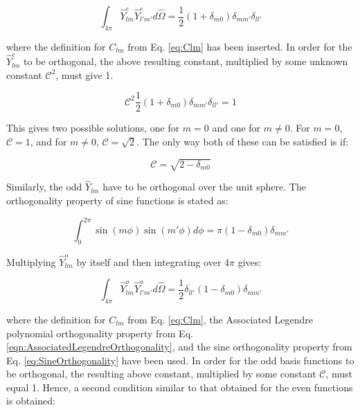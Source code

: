 \documentclass[10pt]{article}
\newcommand{\hO}{\hat{\Omega}}
\begin{document}
\begin{flushleft}
\begin{tcolorbox}[breakable]
\begin{equation}
\label{eq:EvenRequriedOrthogonality2}
\int_{4\pi}^{}\hat{Y}_{lm}^e\hat{Y}_{l'm'}^ed\hO  =\frac{1}{2}(1+\delta_{m0})\delta_{mm'}\delta_{ll'}
\end{equation}

where the definition for \(C_{lm}\) from Eq. \eqref{eq:Clm} has been inserted. In order for the \(\hat{Y}_{lm}^e\) to be orthogonal, the above resulting constant, multiplied by some unknown constant \(\mathscr{C}^2\), must give 1. 

\begin{equation}
\mathscr{C}^2\frac{1}{2}(1+\delta_{m0})\delta_{mm'}\delta_{ll'}=1
\end{equation}

This gives two possible solutions, one for \(m=0\) and one for \(m\neq 0\). For \(m=0\), \(\mathscr{C}=1\), and for \(m\neq0\), \(\mathscr{C}=\sqrt{2}\). The only way both of these can be satisfied is if:

\begin{equation}
\mathscr{C}=\sqrt{2-\delta_{m0}}
\end{equation}

Similarly, the odd \(\hat{Y}_{lm}\) have to be orthogonal over the unit sphere. The orthogonality property of sine functions is stated as:

\begin{equation}
\label{eq:SineOrthogonality}
\int_{0}^{2\pi}\sin{(m\phi)}\sin{(m'\phi)}d\phi=\pi(1-\delta_{m0})\delta_{mm'}
\end{equation}

Multiplying \(\hat{Y}_{lm}^o\) by itself and then integrating over \(4\pi\) gives:

\begin{equation}
\label{eq:OddRequriedOrthogonality2}
\int_{4\pi}^{}\hat{Y}_{lm}^o\hat{Y}_{l'm'}^od\hO  =\frac{1}{2}\delta_{ll'}(1-\delta_{m0})\delta_{mm'}
\end{equation}

where the definition for \(C_{lm}\) from Eq. \eqref{eq:Clm}, the Associated Legendre polynomial orthogonality property from Eq. \eqref{eqn:AssociatedLegendreOrthogonality}, and the sine orthogonality property from Eq. \eqref{eq:SineOrthogonality} have been used. In order for the odd basis functions to be orthogonal, the resulting above constant, multiplied by some constant \(\mathscr{C}\), must equal 1. Hence, a second condition similar to that obtained for the even functions is obtained:


\end{tcolorbox}
\end{flushleft}
\end{document}
